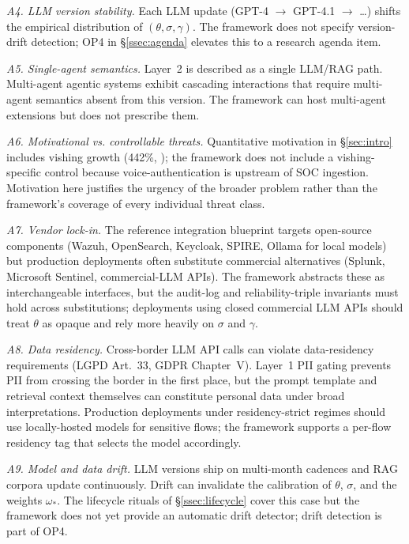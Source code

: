 \documentclass[preprint,12pt,authoryear]{elsarticle}
\begin{document}
\emph{A4. LLM version stability.} Each LLM update (GPT-4 $\to$ GPT-4.1 $\to$ \ldots) shifts the empirical distribution of $(\theta, \sigma, \gamma)$. The framework does not specify version-drift detection; OP4 in §\ref{ssec:agenda} elevates this to a research agenda item.

\emph{A5. Single-agent semantics.} Layer~2 is described as a single LLM/RAG path. Multi-agent agentic systems exhibit cascading interactions \citep{owasp2025agentic} that require multi-agent semantics absent from this version. The framework can host multi-agent extensions but does not prescribe them.

\emph{A6. Motivational vs. controllable threats.} Quantitative motivation in §\ref{sec:intro} includes vishing growth (442\%, \citep{crowdstrike2025}); the framework does not include a vishing-specific control because voice-authentication is upstream of SOC ingestion. Motivation here justifies the urgency of the broader problem rather than the framework's coverage of every individual threat class.

\emph{A7. Vendor lock-in.} The reference integration blueprint targets open-source components (Wazuh, OpenSearch, Keycloak, SPIRE, Ollama for local models) but production deployments often substitute commercial alternatives (Splunk, Microsoft Sentinel, commercial-LLM APIs). The framework abstracts these as interchangeable interfaces, but the audit-log and reliability-triple invariants must hold across substitutions; deployments using closed commercial LLM APIs should treat $\theta$ as opaque and rely more heavily on $\sigma$ and $\gamma$.

\emph{A8. Data residency.} Cross-border LLM API calls can violate data-residency requirements (LGPD Art.~33, GDPR Chapter~V). Layer~1 PII gating prevents PII from crossing the border in the first place, but the prompt template and retrieval context themselves can constitute personal data under broad interpretations. Production deployments under residency-strict regimes should use locally-hosted models for sensitive flows; the framework supports a per-flow residency tag that selects the model accordingly.

\emph{A9. Model and data drift.} LLM versions ship on multi-month cadences and RAG corpora update continuously. Drift can invalidate the calibration of $\theta$, $\sigma$, and the weights $\omega_*$. The lifecycle rituals of §\ref{ssec:lifecycle} cover this case but the framework does not yet provide an automatic drift detector; drift detection is part of OP4.
\end{document}
